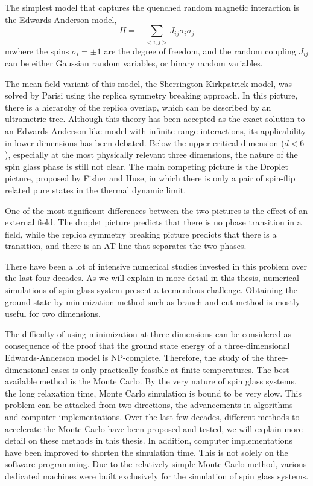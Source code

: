 The simplest model that captures the quenched random magnetic interaction
is the Edwards-Anderson model\cite{Edwards-Anderson1975},
\begin{equation}
  \label{eq:11}
  H=-\sum_{<i,j>}J_{ij}\sigma_i\sigma_j
\end{equation}
mwhere the spins $\sigma_i=\pm 1$ are the degree of freedom, and the random coupling
$J_{ij}$ can be either Gaussian random variables, or binary random variables.

The mean-field variant of this model, the Sherrington-Kirkpatrick model\cite{Sherrington-Kirkpatrick1978,Sherrington-Kirkpatrick-1975}, was 
solved by Parisi\cite{Parisi-1980a,Parisi-1980b,Parisi1980} using the replica 
symmetry breaking approach. In this picture,
there is a hierarchy of the replica overlap, which can be described by an ultrametric
tree. Although this theory has been accepted as the exact solution to an Edwards-Anderson
like model with infinite range interactions, its applicability in lower dimensions 
has been debated. Below the upper critical dimension ($d<6$)\cite{Harris-Lubensky-Chen-1976,Tasaki-1989,Green-Moore-Bray-1983}, 
especially at the most
physically relevant three dimensions, the nature of the spin glass phase is still not clear. 
The main competing picture is the Droplet picture, proposed by Fisher and Huse\citep{Fisher-Huse-1987,Fisher-Huse-1988}, in which 
there is only a pair of spin-flip related pure states in the thermal dynamic
limit.

One of the most significant differences between the two pictures is the effect 
of an external field\cite{Young-Katzgraber2004}. The droplet picture predicts that there is no phase transition
in a field, while the replica symmetry breaking picture predicts that there is a 
transition, and there is an AT line that separates the two phases. 

There have been a lot of intensive numerical studies invested in this problem over 
the last four decades. As we will explain in more detail in this thesis, numerical
simulations of spin glass system present a tremendous challenge. Obtaining the ground
state by minimization method such as branch-and-cut method is mostly useful for 
two dimensions. 

The difficulty of using minimization at three dimensions can be 
considered as consequence of the proof that the ground state energy of a three-dimensional
Edwards-Anderson model is NP-complete. Therefore, the study of the three-dimensional
cases is only practically feasible at finite temperatures. The best available method
is the Monte Carlo. By the very nature of spin glass systems, the long relaxation time, 
Monte Carlo simulation is bound to be very slow. This problem can be attacked from 
two directions, the advancements in algorithms and computer implementations. 
Over the last few decades, different methods to accelerate the Monte Carlo 
have been proposed and tested, we will explain more detail on these methods in this thesis. 
In addition, computer implementations have been improved to shorten the simulation
time. This is not solely on the software programming. Due to the relatively 
simple Monte Carlo method, various dedicated machines were built exclusively for the simulation
of spin glass systems. 


